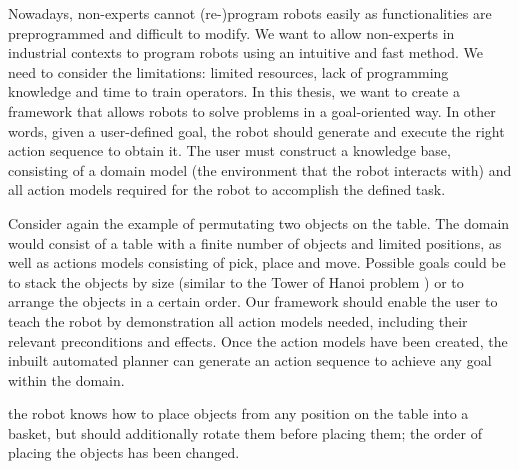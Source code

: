 Nowadays, non-experts cannot (re-)program robots easily as functionalities are preprogrammed and difficult to modify.
We want to allow non-experts in industrial contexts to program robots using an intuitive and fast method.
We need to consider the limitations: limited resources, lack of programming knowledge and time to train operators.
In this thesis, we want to create a framework that allows robots to solve problems in a goal-oriented way.
In other words, given a user-defined goal, the robot should generate and execute the right action sequence to obtain it.
The user must construct a knowledge base, consisting of a domain model (the environment that the robot interacts with) and all action models required for the robot to accomplish the defined task.

Consider again the example of permutating two objects on the table.
The domain would consist of a table with a finite number of objects and limited positions, as well as actions models consisting of pick, place and move. Possible goals could be to stack the objects by size (similar to the Tower of Hanoi problem \cite{douglas1985metamagical}) or to arrange the objects in a certain order. Our framework should enable the user to teach the robot by demonstration all action models needed, including their relevant preconditions and effects. Once the action models have been created, the inbuilt automated planner can generate an action sequence to achieve any goal within the domain. 

the robot knows how to place objects from any position on the table into a basket, but should additionally rotate them before placing them;
the order of placing the objects has been changed.
